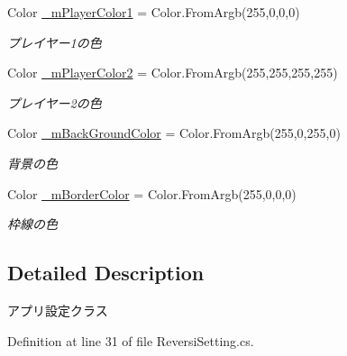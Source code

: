\begin{DoxyCompactItemize}
\mbox{\label{class_reversi_wpf_1_1_reversi_setting_a8cfce0f9d5e665d9a10c2e444e39fc6a}} 
Color \hyperlink{class_reversi_wpf_1_1_reversi_setting_a8cfce0f9d5e665d9a10c2e444e39fc6a}{\+\_\+m\+Player\+Color1} = Color.\+From\+Argb(255,0,0,0)
\begin{DoxyCompactList}\small\item\em プレイヤー1の色 \end{DoxyCompactList}\item 
\mbox{\label{class_reversi_wpf_1_1_reversi_setting_aaa128f83404b7af7c94d9caf70e31641}} 
Color \hyperlink{class_reversi_wpf_1_1_reversi_setting_aaa128f83404b7af7c94d9caf70e31641}{\+\_\+m\+Player\+Color2} = Color.\+From\+Argb(255,255,255,255)
\begin{DoxyCompactList}\small\item\em プレイヤー2の色 \end{DoxyCompactList}\item 
\mbox{\label{class_reversi_wpf_1_1_reversi_setting_a2f2a2f6538d187cd7e9a69a4258779e4}} 
Color \hyperlink{class_reversi_wpf_1_1_reversi_setting_a2f2a2f6538d187cd7e9a69a4258779e4}{\+\_\+m\+Back\+Ground\+Color} = Color.\+From\+Argb(255,0,255,0)
\begin{DoxyCompactList}\small\item\em 背景の色 \end{DoxyCompactList}\item 
\mbox{\label{class_reversi_wpf_1_1_reversi_setting_a0130dbcd32f3c3c865f05ab8fb785602}} 
Color \hyperlink{class_reversi_wpf_1_1_reversi_setting_a0130dbcd32f3c3c865f05ab8fb785602}{\+\_\+m\+Border\+Color} = Color.\+From\+Argb(255,0,0,0)
\begin{DoxyCompactList}\small\item\em 枠線の色 \end{DoxyCompactList}\end{DoxyCompactItemize}


\subsection{Detailed Description}
アプリ設定クラス 

Definition at line 31 of file Reversi\+Setting.\+cs.




